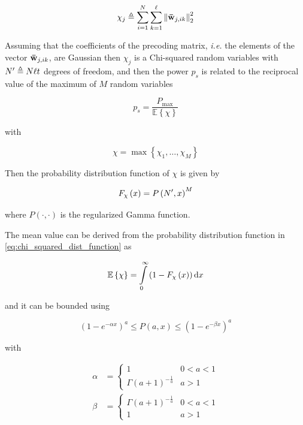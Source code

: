 \begin{equation} \label{eq:chi_squared_j}
    \chi_j \triangleq \sum\limits_{i = 1}^N \sum\limits_{k = 1}^\ell \left\|
    \mathbf{\bar{w}}_{j, ik} \right\|_2^2
\end{equation}

Assuming that the coefficients of the precoding matrix, \emph{i.e.} the elements
of the vector $\mathbf{\bar{w}}_{j, ik}$, are Gaussian then $\chi_j$ is a Chi-squared
random variables with $N^{\prime} \triangleq N\ell t$ degrees of freedom, and then
the power $p_s$ is related to the reciprocal value of the maximum of $M$ random
variables

\begin{equation} \label{eq:ps_reciprocal}
    p_s = \frac{P_{\max}}{\mathbb{E}\left\{\chi\right\}}
\end{equation}

\noindent
with

\begin{equation} \label{eq:chi_squared}
    \chi = \max\left\{\chi_1, \ldots, \chi_M\right\}
\end{equation}

Then the probability distribution function of $\chi$ is given by

\begin{equation} \label{eq:chi_squared_dist_function}
    F_{\chi}\left(x\right) = P\left(N^{\prime}, x\right)^M
\end{equation}

\noindent
where $P\left(\cdot,\cdot\right)$ is the regularized Gamma function.

The mean value can be derived from the probability distribution function in
\eqref{eq:chi_squared_dist_function} as

\begin{equation} \label{eq:chi_squared_mean}
    \mathbb{E}\left\{\chi\right\} = \int\limits_0^\infty \left( 1 - F_{\chi}
    \left(x\right)\right) \text{d} x
\end{equation}

\noindent
and it can be bounded using

\begin{equation} \label{eq:bound_reg_gamma}
    \left(1 - e^{-\alpha x}\right)^a \leq P\left(a,x\right) \leq
    \left(1 - e^{-\beta x}\right)^a
\end{equation}

\noindent
with

\begin{equation} \label{eq:bound_parameters}
\begin{aligned}
    \alpha &= \begin{cases}
    1 & 0 < a < 1 \\
    \Gamma\left(a + 1\right)^{-\frac{1}{a}} & a > 1
    \end{cases} \\
    \beta &= \begin{cases}
    \Gamma\left(a + 1\right)^{-\frac{1}{a}} & 0 < a < 1 \\
    1 & a > 1
    \end{cases}
\end{aligned}
\end{equation}

